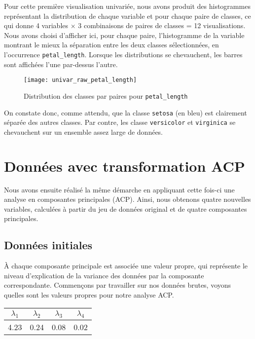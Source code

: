 \documentclass[french]{report}
\begin{document}
    Pour cette première visualisation univariée, nous avons produit des histogrammes représentant la distribution de chaque variable et pour chaque paire de classes, ce qui donne 4 variables $\times$ 3 combinaisons de paires de classes = 12 visualisations.
    Nous avons choisi d'afficher ici, pour chaque paire, l'histogramme de la variable montrant le mieux la séparation entre les deux classes sélectionnées, en l'occurrence \texttt{petal\_length}.
    Lorsque les distributions se chevauchent, les barres sont affichées l'une par-dessus l'autre.
    
    \begin{figure}[h]
        \centering
        \texttt{[image: univar\_raw\_petal\_length]}
        \caption{Distribution des classes par paires pour \texttt{petal\_length}}
    \end{figure}
    
    On constate donc, comme attendu, que la classe \texttt{setosa} (en bleu) est clairement séparée des autres classes.
    Par contre, les classe \texttt{versicolor} et \texttt{virginica} se chevauchent sur un ensemble assez large de données.

    \section{Données avec transformation ACP}
    
    Nous avons ensuite réalisé la même démarche en appliquant cette fois-ci une analyse en composantes principales (ACP).
    Ainsi, nous obtenons quatre nouvelles variables, calculées à partir du jeu de données original et de quatre composantes principales.
    
    \subsection{Données initiales}
    
    À chaque composante principale est associée une valeur propre, qui représente le niveau d'explication de la variance des données par la composante correspondante.
    Commençons par travailler sur nos données brutes, voyons quelles sont les valeurs propres pour notre analyse ACP.
    
    \begin{table}[h]
        \centering
        \begin{tabular}{|c c c c|}
            \hline
            $\lambda_1$ & $\lambda_2$ & $\lambda_3$ & $\lambda_4$ \\
            \hline
            4.23 & 0.24 & 0.08 & 0.02 \\
            \hline
        \end{tabular}
    \end{table}
    
\end{document}
